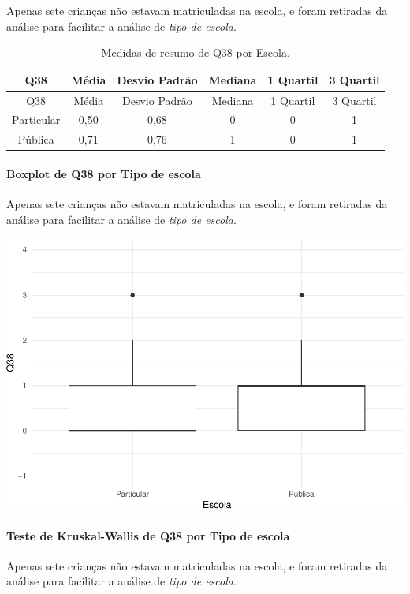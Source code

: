 \documentclass[]{article}
\let\oldparagraph\paragraph
\renewcommand{\paragraph}[1]{\oldparagraph{#1}\mbox{}}
\begin{document}
Apenas sete crianças não estavam matriculadas na escola, e foram retiradas da análise para facilitar a análise de \emph{tipo de escola}.

\begin{longtable}[]{@{}cccccc@{}}
\caption{\label{tab:unnamed-chunk-1473}Medidas de resumo de Q38 por Escola.}\tabularnewline
\toprule
Q38 & Média & Desvio Padrão & Mediana & 1 Quartil & 3 Quartil\tabularnewline
\midrule
\endfirsthead
\toprule
Q38 & Média & Desvio Padrão & Mediana & 1 Quartil & 3 Quartil\tabularnewline
\midrule
\endhead
Particular & 0,50 & 0,68 & 0 & 0 & 1\tabularnewline
Pública & 0,71 & 0,76 & 1 & 0 & 1\tabularnewline
\bottomrule
\end{longtable}

\hypertarget{boxplot-de-q38-por-tipo-de-escola}{%
\paragraph{Boxplot de Q38 por Tipo de escola}\label{boxplot-de-q38-por-tipo-de-escola}}

Apenas sete crianças não estavam matriculadas na escola, e foram retiradas da análise para facilitar a análise de \emph{tipo de escola}.

\begin{center}\includegraphics[width=0.75\linewidth]{relatorio_covid19_files/figure-latex/unnamed-chunk-1474-1} \end{center}

\hypertarget{teste-de-kruskal-wallis-de-q38-por-tipo-de-escola}{%
\paragraph{Teste de Kruskal-Wallis de Q38 por Tipo de escola}\label{teste-de-kruskal-wallis-de-q38-por-tipo-de-escola}}

Apenas sete crianças não estavam matriculadas na escola, e foram retiradas da análise para facilitar a análise de \emph{tipo de escola}.
\end{document}

